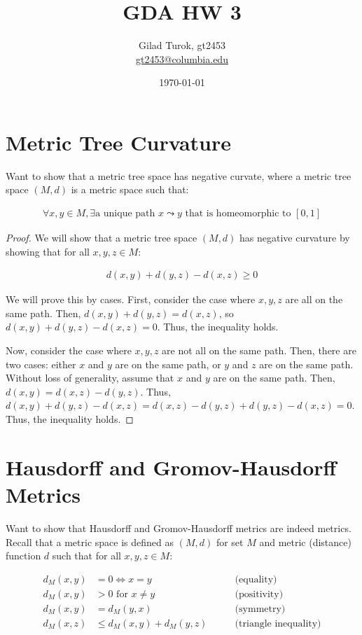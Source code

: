 \documentclass{article}
\title{GDA HW 3}
\author{Gilad Turok, gt2453 \\ \href{mailto:gt2453@columbia.edu}{gt2453@columbia.edu}}
\date{\today}
\begin{document}
\maketitle

\section{Metric Tree Curvature}
    Want to show that a metric tree space has negative curvate, where a metric tree space $(M,d)$ is a metric space such that:
    
    \begin{align*}
        \forall x,y \in M, \exists \textrm{a unique path } x \leadsto y \textrm{ that is homeomorphic to } [0,1]
    \end{align*}

    \begin{proof}
    We will show that a metric tree space $(M,d)$ has negative curvature by showing that for all $x,y,z \in M$:

    \begin{align*}
        d(x,y) + d(y,z) - d(x,z) \geq 0
    \end{align*}

    We will prove this by cases. First, consider the case where $x,y,z$ are all on the same path. Then, $d(x,y) + d(y,z) = d(x,z)$, so $d(x,y) + d(y,z) - d(x,z) = 0$. Thus, the inequality holds.

    Now, consider the case where $x,y,z$ are not all on the same path. Then, there are two cases: either $x$ and $y$ are on the same path, or $y$ and $z$ are on the same path. Without loss of generality, assume that $x$ and $y$ are on the same path. Then, $d(x,y) = d(x,z) - d(y,z)$. Thus, $d(x,y) + d(y,z) - d(x,z) = d(x,z) - d(y,z) + d(y,z) - d(x,z) = 0$. Thus, the inequality holds.
    \end{proof}

\section{Hausdorff and Gromov-Hausdorff Metrics}

Want to show that Hausdorff and Gromov-Hausdorff metrics are indeed metrics. Recall that a metric space is defined as $(M, d)$ for set $M$ and metric (distance) function $d$ such that for all $x,y,z \in M$:

\begin{align*}
    d_M(x,y) &= 0 \iff x = y \qquad &\textrm{(equality)}\\
    d_M(x,y) &> 0 \textrm{ for } x \neq y \qquad &\textrm{(positivity)} \\
    d_M(x,y) &= d_M(y,x) \qquad &\textrm{(symmetry)} \\
    d_M(x, z) &\leq d_M(x,y) + d_M(y,z) \qquad &\textrm{(triangle inequality)}
\end{align*}   
\end{document}
